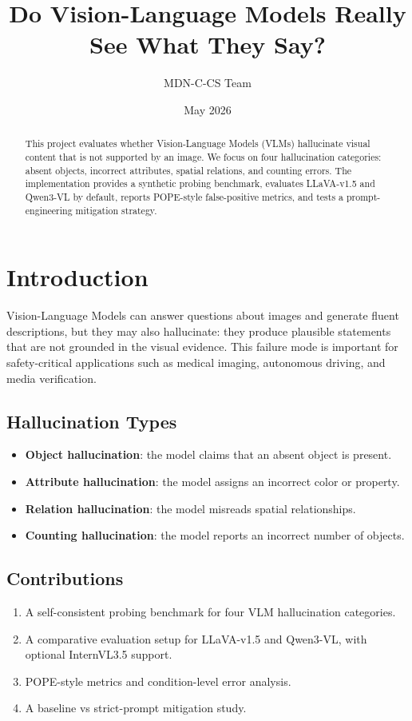 \documentclass[11pt,a4paper]{article}
\title{Do Vision-Language Models Really See What They Say?}
\author{MDN-C-CS Team}
\date{May 2026}
\begin{document}
\maketitle

\begin{abstract}
This project evaluates whether Vision-Language Models (VLMs) hallucinate visual content that is not supported by an image. We focus on four hallucination categories: absent objects, incorrect attributes, spatial relations, and counting errors. The implementation provides a synthetic probing benchmark, evaluates LLaVA-v1.5 and Qwen3-VL by default, reports POPE-style false-positive metrics, and tests a prompt-engineering mitigation strategy.
\end{abstract}

\section{Introduction}

Vision-Language Models can answer questions about images and generate fluent descriptions, but they may also hallucinate: they produce plausible statements that are not grounded in the visual evidence. This failure mode is important for safety-critical applications such as medical imaging, autonomous driving, and media verification.

\subsection{Hallucination Types}

\begin{itemize}
    \item \textbf{Object hallucination}: the model claims that an absent object is present.
    \item \textbf{Attribute hallucination}: the model assigns an incorrect color or property.
    \item \textbf{Relation hallucination}: the model misreads spatial relationships.
    \item \textbf{Counting hallucination}: the model reports an incorrect number of objects.
\end{itemize}

\subsection{Contributions}

\begin{enumerate}
    \item A self-consistent probing benchmark for four VLM hallucination categories.
    \item A comparative evaluation setup for LLaVA-v1.5 and Qwen3-VL, with optional InternVL3.5 support.
    \item POPE-style metrics and condition-level error analysis.
    \item A baseline vs strict-prompt mitigation study.
\end{enumerate}
\end{document}
